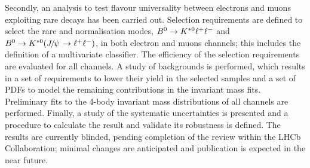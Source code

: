 Secondly, an analysis to test flavour universality between electrons and muons exploiting rare decays has been carried out.
Selection requirements are defined to select the rare and normalisation modes, $B^0\rightarrow K^{*0}\ell^+ \ell^-$ 
and $\Bz\to\Kstarz(\jpsi\to\ll)$, in both electron and muons channels; this includes the definition of a 
multivariate classifier. The efficiency of the selection requirements are evaluated for all channels.
A study of backgrounds is performed, which results in
a set of requirements to lower their yield in the selected samples and a set of PDFs to model
the remaining contributions in the invariant mass fits. Preliminary fits to the 4-body invariant mass distributions
of all channels are performed. Finally, a study of the systematic uncertainties is presented and
a procedure to calculate the result and validate its robustness is defined. The results are currently blinded,
pending completion of the review within the LHCb Collaboration; minimal changes are anticipated 
and publication is expected in the near future.


